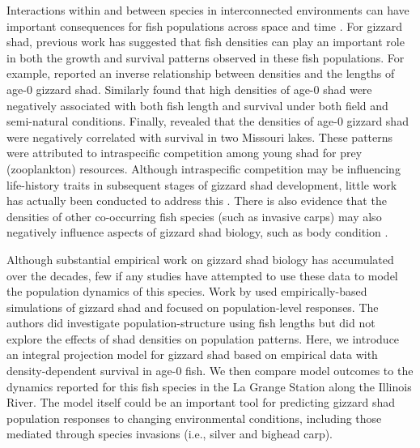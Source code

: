 \documentclass[preprint,review,12pt,authoryear]{elsarticle}
\begin{document}
Interactions within and between species in interconnected environments can have important consequences for fish populations across space and time \citep{thorp2006riverine}.  
For gizzard shad, previous work has suggested that fish densities can play an important role in both the growth and survival patterns observed in these fish populations.  
For example, \citep{buynak1992differential} reported an inverse relationship between densities and the lengths of age-0 gizzard shad.  Similarly \citep{welker1994growth} found that high densities of age-0 shad were negatively associated with both fish length and survival under both field and semi-natural conditions. Finally, \citep{michaletz2010overwinter} revealed that the densities of age-0 gizzard shad were negatively correlated with survival in two Missouri lakes.  
These patterns were attributed to intraspecific competition among young shad for prey (zooplankton) resources. Although intraspecific competition may be influencing life-history traits in subsequent stages of gizzard shad development, little work has actually been conducted to address this \citep{dicenzo1996relations}. 
There is also evidence that the densities of other co-occurring fish species (such as invasive carps) may also negatively influence aspects of gizzard shad biology, such as body condition \citep{irons2007reduced,love2018does}.

Although substantial empirical work on gizzard shad biology has accumulated over the decades, few if any studies have attempted to use these data to model the population dynamics of this species.
Work by \citet{catalano2010size, catalano2011whole} used empirically-based simulations of gizzard shad and focused on population-level responses.
The authors did investigate population-structure using fish lengths but did
not explore the effects of shad densities on population patterns.
Here, we introduce an integral projection model for gizzard shad based on empirical data with density-dependent survival in age-0 fish.
We then compare model outcomes to the dynamics reported for this fish species in the La Grange Station along the Illinois River.
The model itself could be an important tool for predicting gizzard shad population responses to changing environmental conditions, including those mediated through species invasions (i.e., silver and bighead carp).
\end{document}
